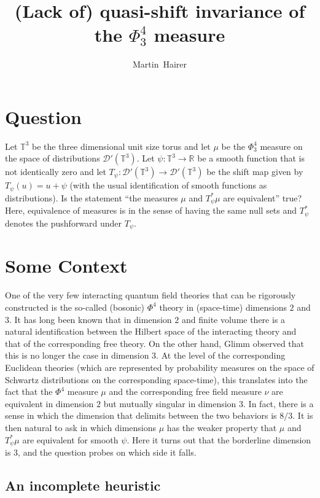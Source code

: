 \documentclass[a4paper,11pt]{article}
\numberwithin{equation}{section}
\newcommand{\RR}{\mathbb{R}}      %
\newcommand{\TT}{\mathbb{T}}
\newcommand{\dD}{\mathcal{D}}
\begin{document}
\title{(Lack of) quasi-shift invariance of the $\Phi^4_3$ measure}
\author{Martin~Hairer}
\date{}
\maketitle

\section{Question}


Let $\TT^3$ be the three dimensional unit size torus and let $\mu$ be the $\Phi^4_3$ measure on the space of distributions $\dD'(\TT^3)$. Let $\psi : \TT^3 \to \RR$ be a smooth function that is not identically zero and let $T_\psi : \dD'(\TT^3) \to \dD'(\TT^3)$ be the shift map given by $T_\psi(u) = u + \psi$ (with the usual identification of smooth functions as distributions). Is the statement ``the measures $\mu$ and $T_\psi^* \mu$ are equivalent'' true? Here, equivalence of measures is in the sense of having the same null sets and $T_\psi^*$ denotes the pushforward under $T_\psi$.


\section{Some Context}

One of the very few interacting quantum field theories that can be rigorously constructed is the
so-called (bosonic) $\Phi^4$ theory in (space-time) dimensions $2$ and $3$. It has long been known that
in dimension $2$ and finite volume there is a natural identification between the Hilbert space of the
interacting theory and that of the corresponding free theory. On the other hand, 
Glimm \cite{Glimm} observed that this is no longer the case in dimension $3$. At the level of the 
corresponding Euclidean theories (which are represented by probability measures on the
space of Schwartz distributions on the corresponding space-time), this translates into the fact that the 
$\Phi^4$ measure $\mu$ and the corresponding free field measure $\nu$ are equivalent in dimension $2$
but mutually singular in dimension $3$. In fact, there is a sense in which the dimension that delimits
between the two behaviors is $8/3$. It is then natural to ask in which dimensions $\mu$
has the weaker property that $\mu$ and $T_\psi^* \mu$ are equivalent for smooth $\psi$. Here it turns out
that the borderline dimension is $3$, and the question probes on which side it falls.

\subsection{An incomplete heuristic}
\end{document}
